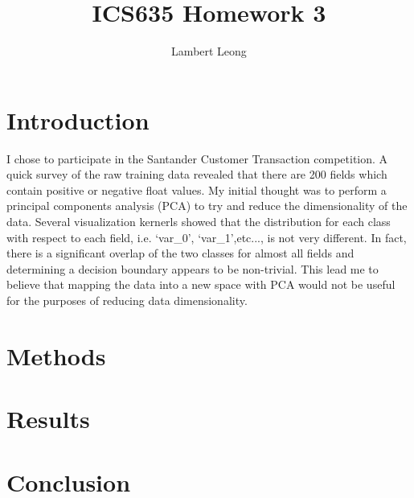 \documentclass[11pt,letterpaper]{article}
\newcommand{\homework}[2]{
\setcounter{section}{#1}
\section*{ICS635 Homework {\thesection}: {#2} }
{\markboth{#2}{#2}}
}
\begin{document}
\title{ICS635 Homework 3}
\author{Lambert Leong}
\maketitle
\section{Introduction}
I chose to participate in the Santander Customer Transaction competition.  A
quick survey of the raw training data revealed that there are 200 fields which
contain positive or negative float values.  My initial thought was to perform a
principal components analysis (PCA) to try and reduce the dimensionality of the
data.  Several visualization kernerls showed that the distribution for each
class with respect to each field, i.e. `var\_0', `var\_1',etc..., is not very
different.  In fact, there is a significant overlap of the two classes for
almost all fields and determining a decision boundary appears to be non-trivial.
This lead me to believe that mapping the data into a new space with PCA would
not be useful for the purposes of reducing data dimensionality.




\section{Methods}




\section{Results}

\section{Conclusion}
\end{document}
